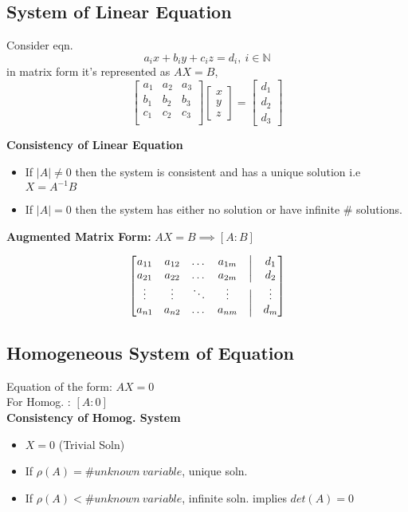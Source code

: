 \documentclass[12pt]{article}
\newcommand{\N}{\mathbb{N}}
\begin{document}
\subsection*{System of Linear Equation}
Consider eqn. $$a_ix+b_iy+c_iz = d_i, \: i \in \N $$
in matrix form it's represented as $AX=B$, 
\[
	\begin{bmatrix}
	a_{1} & a_{2} & a_{3} \\
	b_{1} & b_{2} & b_{3} \\
	c_{1} & c_{2} & c_{3} \\
	\end{bmatrix}
	\begin{bmatrix}
	x \\
	y \\
	z
	\end{bmatrix}
	= \begin{bmatrix}
	d_1 \\ d_2 \\ d_3
	\end{bmatrix}
\]

\textbf{Consistency of Linear Equation}
\begin{itemize}
	\item If $|A| \not= 0$ then the system is consistent and has a unique solution i.e $X = A^{-1}B$
	\item If $|A| = 0$ then the system has either no solution or have infinite \# solutions.
\end{itemize}

\textbf{Augmented Matrix Form: } $AX=B \implies [A:B]$

\[
 \begin{bmatrix}
	 a_{11} & a_{12} & \dots & a_{1m} &\bigm| & d_1 \\
	 a_{21} & a_{22} & \dots & a_{2m} &\bigm| & d_2 \\
	 \vdots & \vdots & \ddots & \vdots&\bigm| & \vdots \\
     a_{n1} & a_{n2} & \dots & a_{nm} &\bigm| & d_m \\
 \end{bmatrix}
\]

\subsection*{Homogeneous System of Equation}
Equation of the form: $AX=0$ \\
For Homog. : $[A:0]$ \\

\textbf{Consistency of Homog. System}
\begin{itemize}
	\item $X=0$ (Trivial Soln)
	\item If $\rho (A) = \# unknown\: variable$, unique soln.
	\item If $\rho (A) < \# unknown \:variable$, infinite soln. implies $det(A)=0$
\end{itemize}
\end{document}

